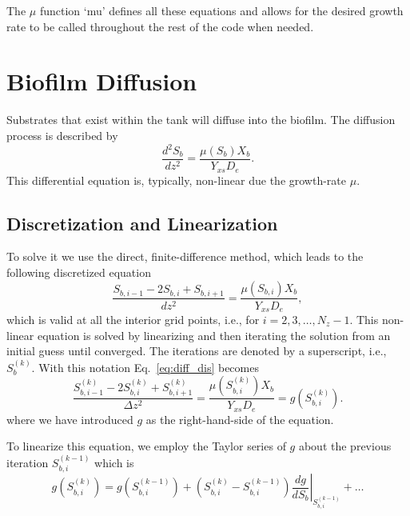\documentclass[letterpaper, twoside]{article}
\newcommand{\ie}{i.e.}
\begin{document}
The $\mu$ function `mu' defines all these equations and allows for the desired growth rate to be called throughout the rest of the code when needed.
  

\section{Biofilm Diffusion}
Substrates that exist within the tank will diffuse into the biofilm.  The diffusion process is described by
\begin{equation} \label{eq:diffusion}
  \frac{d^2 S_b}{dz^2} = \frac{\mu(S_b) X_b}{Y_{xs} D_e}.
\end{equation}
This differential equation is, typically, non-linear due the growth-rate $\mu$.

\subsection{Discretization and Linearization}
To solve it we use the direct, finite-difference method, which leads to the following discretized equation
\begin{equation} \label{eq:diff_dis}
  \frac{ S_{b,i-1} - 2 S_{b,i} + S_{b,i+1}}{dz^2} = \frac{\mu(S_{b,i}) X_b}{Y_{xs} D_e},
\end{equation}
which is valid at all the interior grid points, \ie, for $i=2,3,\dots,N_z-1$. 
This non-linear equation is solved by linearizing and then iterating the solution from an initial guess until converged.
The iterations are denoted by a superscript, \ie, $S_{b}^{(k)}$.  With this notation Eq.~\ref{eq:diff_dis} becomes
\begin{equation} \label{eq:diff_dis_iter}
  \frac{ S_{b,i-1}^{(k)} - 2 S_{b,i}^{(k)} + S_{b,i+1}^{(k)}}{\Delta z^2} = \frac{\mu\left(S_{b,i}^{(k)}\right) X_b}{Y_{xs} D_e} =  g\left(S_{b,i}^{(k)}\right).
\end{equation}
where we have introduced $g$ as the right-hand-side of the equation.

To linearize this equation, we employ the Taylor series of $g$ about the previous iteration $S_{b,i}^{(k-1)}$ which is
\begin{equation}\label{eq:TaylorSeries}
  g\left(S_{b,i}^{(k)}\right) =   g\left(S_{b,i}^{(k-1)}\right) + \left( S_{b,i}^{(k)} - S_{b,i}^{(k-1)}\right) \left.\frac{d g}{d S_b}\right|_{S_{b,i}^{(k-1)}} + \dots
\end{equation}
\end{document}
